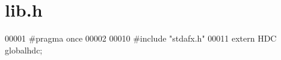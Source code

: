 \hypertarget{lib_8h_source}{}\section{lib.\+h}
\label{lib_8h_source}

\begin{DoxyCode}
00001 \textcolor{preprocessor}{#pragma once}
00002 
00010 \textcolor{preprocessor}{#include "stdafx.h"}
00011 \textcolor{keyword}{extern} HDC globalhdc;
\end{DoxyCode}
